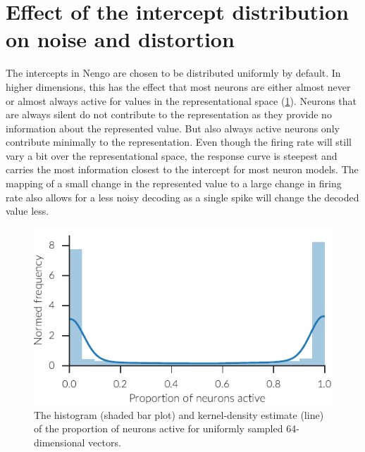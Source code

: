 \section{Effect of the intercept distribution on noise and distortion}
The intercepts in Nengo are chosen to be distributed uniformly by default.
In higher dimensions, this has the effect that most neurons are either almost never or almost always active for values in the representational space (\cref{fig:act-proportion}).
Neurons that are always silent do not contribute to the representation as they provide no information about the represented value.
But also always active neurons only contribute minimally to the representation.
Even though the firing rate will still vary a bit over the representational space, the response curve is steepest and carries the most information closest to the intercept for most neuron models.
The mapping of a small change in the represented value to a large change in firing rate also allows for a less noisy decoding as a single spike will change the decoded value less.
\begin{figure}
    \centering
    \includegraphics{figures/act-proportion}
    \caption[Distribution of the proportion of active neurons]{The histogram (shaded bar plot) and kernel-density estimate (line) of the proportion of neurons active for uniformly sampled 64-dimensional vectors.}\label{fig:act-proportion}
\end{figure}

